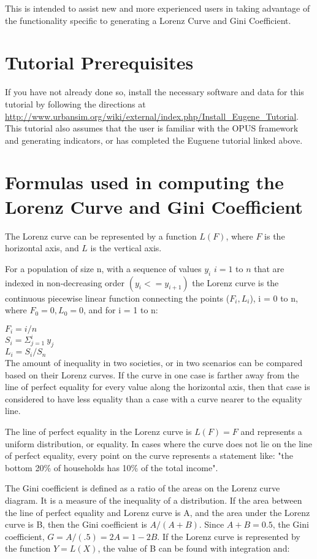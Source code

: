 \documentclass{howto}
\begin{document}
This is intended to assist new and more experienced users in taking
advantage of the functionality specific to generating a Lorenz Curve
and Gini Coefficient.

\section*{Tutorial Prerequisites}

If you have not already done so, install the necessary software and
data for this tutorial by following the directions at
\url{http://www.urbansim.org/wiki/external/index.php/Install_Eugene_Tutorial}. 
This tutorial also assumes that the user is familiar with the OPUS framework and 
generating indicators, or has completed the Euguene tutorial 
linked above.

\section*{Formulas used in computing the Lorenz Curve and Gini Coefficient}

The Lorenz curve can be represented by a function $L(F)$, where $F$ is the horizontal axis, 
and $L$ is the vertical axis.

For a population of size n, with a sequence of values $y_{i}$ $i = 1$ to $n$ that are indexed in non-decreasing order $(y_{i} <= y_{i+1})$ the Lorenz curve is the continuous piecewise linear function connecting the points ($ F_i , L_i $), i = 0 to n, where $F_0 = 0, L_0 = 0$, and for i = 1 to n:

    $F_{i} = i/n $ \\
    $S_{i}= \Sigma_{j=1}^i\  y_{j}$ \\
    $L_{i} = S_i / S_n $ \\

The amount of inequality in two societies, or in two scenarios can be compared
based on their Lorenz curves.  If the curve in one case is farther away from
the line of perfect equality for every value along the horizontal axis, then
that case is considered to have less equality than a case with a curve nearer
to the equality line.

The line of perfect equality in the Lorenz curve is $L(F) = F$ and represents a uniform distribution, or equality.  
In cases where the curve does not lie on the line of perfect equality, every point on the curve represents a 
statement like: "the bottom 20\% of households has 10\% of the total income".


The Gini coefficient is defined as a ratio of the areas on the Lorenz curve diagram. 
It is a measure of the inequality of a distribution.  If the area between the line of 
perfect equality and Lorenz curve is A, and the area under the Lorenz curve is B, then the 
Gini coefficient is $A/(A+B)$. Since $A+B = 0.5$, the Gini coefficient, $G = A/(.5) = 2A = 1-2B$. 
If the Lorenz curve is represented by the function $Y = L(X)$, the value of B can be found with integration and:
\end{document}
